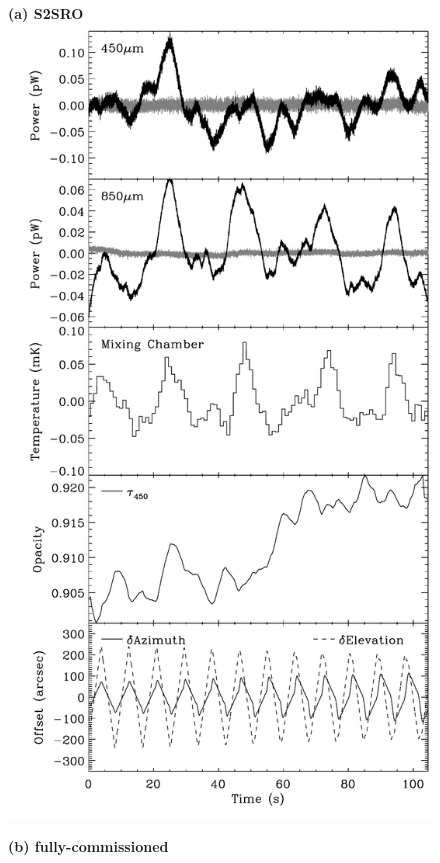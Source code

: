 \documentclass[useAMS,usenatbib,nofootinbib]{mn2e}
\begin{document}
\begin{figure}
\centering

\begin{minipage}[h]{0.495\linewidth}
\textbf{(a) S2SRO} \\

\includegraphics[width=\linewidth]{bolos_point_mix_s2sro}
\end{minipage}
\begin{minipage}[h]{0.495\linewidth}
\textbf{(b) fully-commissioned} \\


\end{minipage}
\end{figure}
\end{document}
